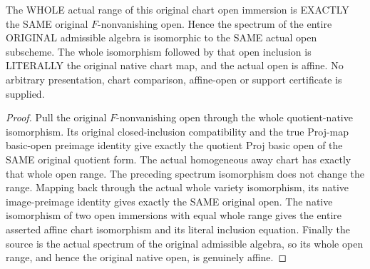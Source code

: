 \begin{theorem}
\label{projective:actual-original-admissible-chart-scheme-iso}
\leanok
{}
The WHOLE actual range of this original chart open immersion is EXACTLY
the SAME original $F$-nonvanishing open. Hence the spectrum of the entire
ORIGINAL admissible algebra is isomorphic to the SAME actual open
subscheme. The whole isomorphism followed by that open inclusion is
LITERALLY the original native chart map, and the actual open is affine.
No arbitrary presentation, chart comparison, affine-open or support
certificate is supplied.
\end{theorem}
\begin{proof}
Pull the original $F$-nonvanishing open through the whole quotient-native
isomorphism. Its original closed-inclusion compatibility and the true
Proj-map basic-open preimage identity give exactly the quotient Proj
basic open of the SAME original quotient form. The actual homogeneous
away chart has exactly that whole open range. The preceding spectrum
isomorphism does not change the range. Mapping back through the actual
whole variety isomorphism, its native image-preimage identity gives
exactly the SAME original open. The native isomorphism of two open
immersions with equal whole range gives the entire asserted affine
chart isomorphism and its literal inclusion equation. Finally the source
is the actual spectrum of the original admissible algebra, so its whole
open range, and hence the original native open, is genuinely affine.
\end{proof}

